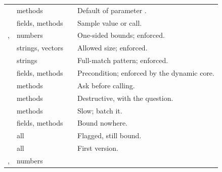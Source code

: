 \begin{center}
\begin{longtable}{@{}L{2.5cm}L{2.0cm}L{5.2cm}L{4.2cm}@{}}
\addlinespace
{} & methods &  \newline
   & Default of parameter . \\
\addlinespace
{} & fields, methods &  \newline {} &
  Sample value or call. \\
\addlinespace
{},  & numbers &  \newline {} &
  One-sided bounds; enforced. \\
\addlinespace
{} & strings, vectors &  \newline {} &
  Allowed size; enforced. \\
\addlinespace
{} & strings &  \newline {} &
  Full-match pattern; enforced. \\
\addlinespace
{} & fields, methods &  \newline
   & Precondition; enforced by the dynamic core. \\
\addlinespace
{} & methods &  \newline {} &
  Ask before calling. \\
\addlinespace
{} & methods &  \newline {} &
  Destructive, with the question. \\
\addlinespace
{} & methods &  \newline {} &
  Slow; batch it. \\
\addlinespace
{} & fields, methods &  \newline {} &
  Bound nowhere. \\
\addlinespace
{} & all &  \newline {} &
  Flagged, still bound. \\
\addlinespace
{} & all &  \newline {} & First version. \\
\addlinespace
{},  & numbers &  \newline {} &

\end{longtable}
\end{center}
